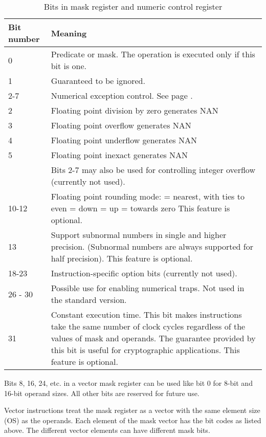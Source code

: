 \documentclass[forwardcom.tex]{subfiles}
\begin{document}
\begin{longtable}
{|p{15mm}|p{90mm}|}
\caption{Bits in mask register and numeric control register}
\label{table:maskBits}
\endfirsthead
\endhead
\hline
\bfseries Bit number & \bfseries Meaning \\
 \hline
0 & Predicate or mask. The operation is executed only if this bit is one.\\
1 & Guaranteed to be ignored. \\
\hline
2-7 & Numerical exception control. See page \pageref{table:FPExceptionResults}. \\
2 & Floating point division by zero generates NAN \\
3 & Floating point overflow generates NAN \\
4 & Floating point underflow generates NAN \\
5 & Floating point inexact generates NAN \\
  & Bits 2-7 may also be used for controlling integer overflow (currently not used).\\ \hline
10-12 & Floating point rounding mode: \newline
000 = nearest, with ties to even \newline
001 = down \newline
010 = up \newline
011 = towards zero \newline
This feature is optional.\\ \hline
13 & Support subnormal numbers in single and higher precision. 
(Subnormal numbers are always supported for half precision). This feature is optional.\\ \hline  
  
18-23 & Instruction-specific option bits (currently not used). \\
\hline
26 - 30 & Possible use for enabling numerical traps. Not used in the standard version. \\
\hline
31 & Constant execution time. This bit makes instructions take the same number of clock cycles regardless of the values of mask and operands. The guarantee provided by this bit is useful for cryptographic applications. This feature is optional. \\
\hline
\end{longtable}

Bits 8, 16, 24, etc. in a vector mask register can be used like bit 0 for 8-bit and 16-bit operand sizes. All other bits are reserved for future use.
\vv

Vector instructions treat the mask register as a vector with the same element size (OS) as the operands. Each element of the mask vector has the bit codes as listed above. The different vector elements can have different mask bits.
\vv
\end{document}
